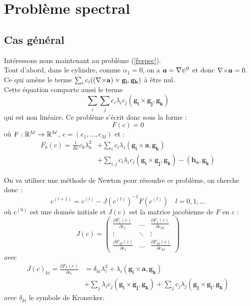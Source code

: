 \chapter{Problème spectral}
\section{Cas général}
Intéressons nous maintenant au problème (\ref{fvspec}).\\
Tout d'abord, dans le cylindre, comme $\alpha_1=0$, on a $\bm{a}={\nabla}\psi^0$ et donc ${\nabla\times} \bm{a} = 0$. Ce qui amène le terme $\sum_i c_i(({\nabla\times} \mathbf{a})\times \mathbf{g_i}, \mathbf{g_k})$ à être nul.\\
Cette équation comporte aussi le terme
\[ \sum_i\sum_j c_i\lambda_i c_j(\mathbf{g_i}\times \mathbf{g_j}, \mathbf{g_k}) \]
qui est non linéaire. Ce problème s'écrit donc sous la forme :
\[ F(c) = 0 \]
où $F:{\mathbb{R}}^M\rightarrow{\mathbb{R}}^M$, $c=(c_1,\ldots, c_M)$ et :
\begin{align*}
F_k(c) = \frac{1}{Re} c_k\lambda_k^2 &+ \sum_i c_i\lambda_i(\mathbf{g_i}\times \mathbf{a}, \mathbf{g_k})\\
&+ \sum_{i,j} c_i\lambda_i c_j (\mathbf{g_i}\times \mathbf{g_j}, \mathbf{g_k}) - (\mathbf{h_a},\mathbf{g_k})
\end{align*}

On va utiliser une méthode de Newton pour résoudre ce problème, on cherche donc :
\begin{equation}\label{Newton}
c^{(l+1)} = c^{(l)} - J(c^{(l)})^{-1}F(c^{(l)})\quad l=0,1,\ldots
\end{equation}
où $c^{(0)}$ est une donnée initiale et $J(c)$ est la matrice jacobienne de $F$ en $c$ :
\[ J(c)=
\begin{pmatrix}
\frac{\partial F_1(c)}{\partial c_1} & \ldots & \frac{\partial F_1(c)}{\partial c_M}\\
\vdots & \ddots & \vdots\\
\frac{\partial F_M(c)}{\partial c_1} & \ldots & \frac{\partial F_M(c)}{\partial c_M}
\end{pmatrix}\]
avec 
\begin{align*}
J(c)_{ki} = \frac{\partial F_k(c)}{\partial c_i} &= \delta_{ki}\lambda_i^2 + \lambda_i(\mathbf{g_i}\times \mathbf{a},\mathbf{g_k})\\
&+ \sum_j\lambda_i c_j (\mathbf{g_i}\times\mathbf{g_j},\mathbf{g_k}) + \sum_j c_j\lambda_j (\mathbf{g_j}\times\mathbf{g_i},\mathbf{g_k})
\end{align*}
avec $\delta_{ki}$ le symbole de Kronecker.\\

